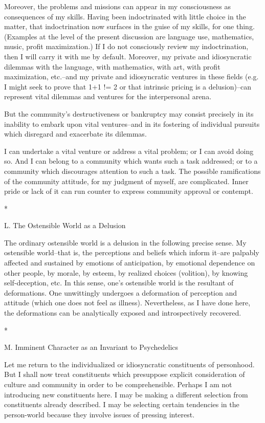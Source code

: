 Moreover, the problems and missions can appear in my consciousness as consequences of my skills. Having been indoctrinated with little choice in the matter, that indoctrination now surfaces in the guise of my skills, for one thing. (Examples at the level of the present discussion are language use, mathematics, music, profit maximization.) If I do not consciously review my indoctrination, then I will carry it with me by default. Moreover, my private and idiosyncratic dilemmas with the language, with mathematics, with art, with profit maximization, etc.--and my private and idiosyncratic ventures in these fields (e.g. I might seek to prove that 1+1 != 2 or that intrinsic pricing is a delusion)--can represent vital dilemmas and ventures for the interpersonal arena.

But the community's destructiveness or bankruptcy may consist precisely in its inability to embark upon vital ventures--and in its fostering of individual pursuits which disregard and exacerbate its dilemmas.

I can undertake a vital venture or address a vital problem; or I can avoid doing so. And I can belong to a community which wants such a task addressed; or to a community which discourages attention to such a task. The possible ramifications of the community attitude, for my judgment of myself, are complicated. Inner pride or lack of it can run counter to express community approval or contempt.

*

L. The Ostensible World as a Delusion

The ordinary ostensible world is a delusion in the following precise sense. My ostensible world--that is, the perceptions and beliefs which inform it--are palpably affected and sustained by emotions of anticipation, by emotional dependence on other people, by morale, by esteem, by realized choices (volition), by knowing self-deception, etc. In this sense, one's ostensible world is the resultant of deformations. One unwittingly undergoes a deformation of perception and attitude (which one does not feel as illness). Nevertheless, as I have done here, the deformations can be analytically exposed and introspectively recovered.

*

M. Imminent Character as an Invariant to Psychedelics

Let me return to the individualized or idiosyncratic constituents of personhood. But I shall now treat constituents which presuppose explicit consideration of culture and community in order to be comprehensible. Perhaps I am not introducing new constituents here. I may be making a different selection from constituents already described. I may be selecting certain tendencies in the person-world because they involve issues of pressing interest.

